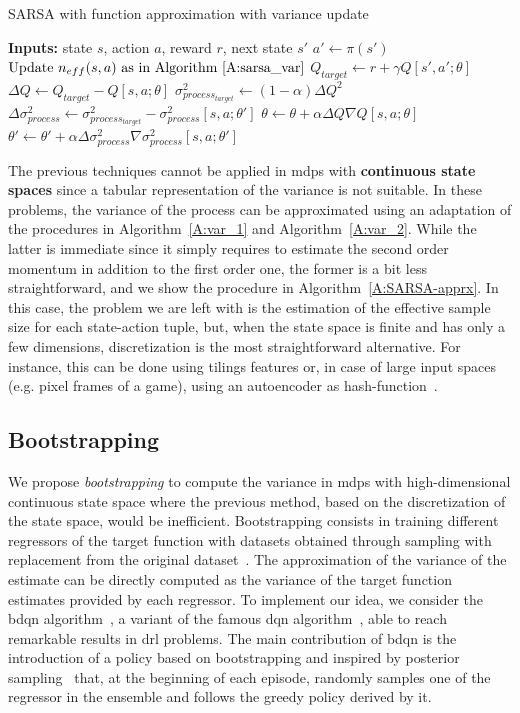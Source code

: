\begin{algorithm}[t]
\caption{SARSA with function approximation with variance update}
\begin{algorithmic}[1]\label{A:SARSA-apprx}
  \STATE \textbf{Inputs:} state $s$, action $a$, reward $r$, next state $s'$
  \STATE $a' \gets \pi(s')$
  \STATE $\text{Update } n_{eff}(s,a) \text{ as in Algorithm~\ref{A:sarsa_var}}$
  \STATE $Q_{target} \gets r + \gamma Q[s',a'; \theta]$
  \STATE $\Delta Q \gets Q_{target} - Q[s,a; \theta]$
  \STATE $\sigma^2_{process_{target}} \gets (1 - \alpha)\Delta Q^2$
  \STATE $\Delta \sigma^2_{process} \gets \sigma^2_{process_{target}} - \sigma^2_{process}[s,a; \theta']$
  \STATE $\theta \gets \theta + \alpha \Delta Q \nabla Q[s,a; \theta]$
  \STATE $\theta' \gets \theta' + \alpha \Delta \sigma^2_{process} \nabla \sigma^2_{process}[s,a; \theta']$
\end{algorithmic}
\end{algorithm}
The previous techniques cannot be applied in \glspl{mdp} with \textbf{continuous state spaces} since a tabular representation of the variance is not suitable. In these problems, the variance of the process can be approximated using an adaptation of the procedures in Algorithm~\ref{A:var_1} and Algorithm~\ref{A:var_2}. While the latter is immediate since it simply requires to estimate the second order momentum in addition to the first order one, the former is a bit less straightforward, and we show the procedure in Algorithm~\ref{A:SARSA-apprx}. In this case, the problem we are left with is the estimation of the effective sample size for each state-action tuple, but, when the state space is finite and has only a few dimensions, discretization is the most straightforward alternative. For instance, this can be done using tilings features or, in case of large input spaces (e.g. pixel frames of a game), using an autoencoder as hash-function~\cite{tang2017exploration}.

\subsection{Bootstrapping}
We propose \textit{bootstrapping} to compute the variance in \glspl{mdp} with high-dimensional continuous state space where the previous method, based on the discretization of the state space, would be inefficient. Bootstrapping consists in training different regressors of the target function with datasets obtained through sampling with replacement from the original dataset~\cite{doi:10.1162/089976600300015204}. The approximation of the variance of the estimate can be directly computed as the variance of the target function estimates provided by each regressor. To implement our idea, we consider the \gls{bdqn} algorithm~\cite{osband2016deep}, a variant of the famous \gls{dqn} algorithm~\cite{mnih2015human}, able to reach remarkable results in \gls{drl} problems. The main contribution of \gls{bdqn} is the introduction of a policy based on bootstrapping and inspired by posterior sampling~\cite{osband2013more} that, at the beginning of each episode, randomly samples one of the regressor in the ensemble and follows the greedy policy derived by it.

